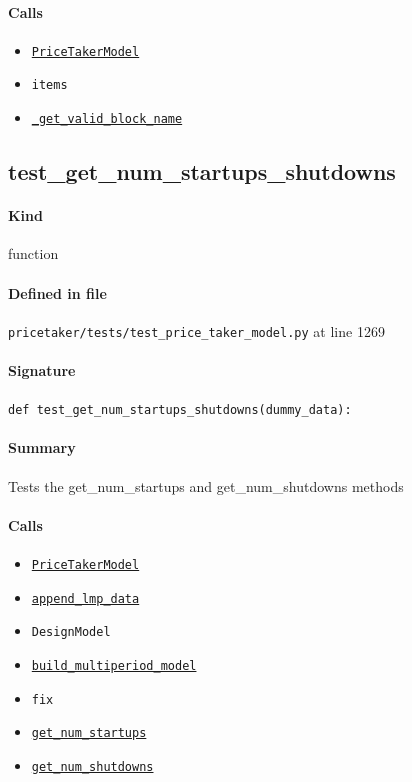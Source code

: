 \documentclass[11pt]{report}
\begin{document}
\paragraph{Calls}
\begin{itemize}[leftmargin=*]
  \item \hyperref[def:pricetaker-price_taker_model.py:PriceTakerModel:L161]{\texttt{PriceTakerModel}}
  \item \texttt{items}
  \item \hyperref[def:pricetaker-price_taker_model.py:PriceTakerModel._get_valid_block_name:L645]{\texttt{\_get\_valid\_block\_name}}
\end{itemize}
\subsection{test\_get\_num\_startups\_shutdowns}
\label{def:pricetaker-tests-test_price_taker_model.py:test_get_num_startups_shutdowns:L1269}
\paragraph{Kind} function
\paragraph{Defined in file} \texttt{pricetaker/tests/test\_price\_taker\_model.py} at line 1269
\paragraph{Signature} \texttt{def test\_get\_num\_startups\_shutdowns(dummy\_data):}
\paragraph{Summary} Tests the get\_num\_startups and get\_num\_shutdowns methods
\paragraph{Calls}
\begin{itemize}[leftmargin=*]
  \item \hyperref[def:pricetaker-price_taker_model.py:PriceTakerModel:L161]{\texttt{PriceTakerModel}}
  \item \hyperref[def:pricetaker-price_taker_model.py:PriceTakerModel.append_lmp_data:L221]{\texttt{append\_lmp\_data}}
  \item \texttt{DesignModel}
  \item \hyperref[def:pricetaker-price_taker_model.py:PriceTakerModel.build_multiperiod_model:L291]{\texttt{build\_multiperiod\_model}}
  \item \texttt{fix}
  \item \hyperref[def:pricetaker-price_taker_model.py:PriceTakerModel.get_num_startups:L1182]{\texttt{get\_num\_startups}}
  \item \hyperref[def:pricetaker-price_taker_model.py:PriceTakerModel.get_num_shutdowns:L1186]{\texttt{get\_num\_shutdowns}}
\end{itemize}
\end{document}
